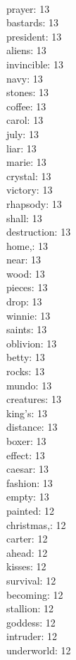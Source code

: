 \begin{multicols}{6}
  \\ prayer: 13
  \\ bastards: 13
  \\ president: 13
  \\ aliens: 13
  \\ invincible: 13
  \\ navy: 13
  \\ stones: 13
  \\ coffee: 13
  \\ carol: 13
  \\ july: 13
  \\ liar: 13
  \\ marie: 13
  \\ crystal: 13
  \\ victory: 13
  \\ rhapsody: 13
  \\ shall: 13
  \\ destruction: 13
  \\ home,: 13
  \\ near: 13
  \\ wood: 13
  \\ pieces: 13
  \\ drop: 13
  \\ winnie: 13
  \\ saints: 13
  \\ oblivion: 13
  \\ betty: 13
  \\ rocks: 13
  \\ mundo: 13
  \\ creatures: 13
  \\ king's: 13
  \\ distance: 13
  \\ boxer: 13
  \\ effect: 13
  \\ caesar: 13
  \\ fashion: 13
  \\ empty: 13
  \\ painted: 12
  \\ christmas,: 12
  \\ carter: 12
  \\ ahead: 12
  \\ kisses: 12
  \\ survival: 12
  \\ becoming: 12
  \\ stallion: 12
  \\ goddess: 12
  \\ intruder: 12
  \\ underworld: 12

\end{multicols}
